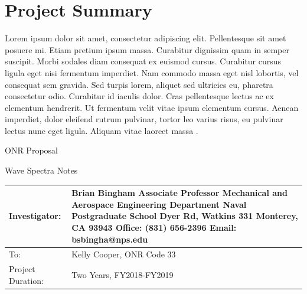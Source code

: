 \documentclass[11pt]{article}
\newcommand{\proposaltitle}{Wave Spectra Notes}
\begin{document}
\section*{Project Summary}
Lorem ipsum dolor sit amet, consectetur adipiscing elit. Pellentesque sit amet posuere mi. Etiam pretium ipsum massa. Curabitur dignissim quam in semper suscipit. Morbi sodales diam consequat ex euismod cursus. Curabitur cursus ligula eget nisi fermentum imperdiet. Nam commodo massa eget nisl lobortis, vel consequat sem gravida. Sed turpis lorem, aliquet sed ultricies eu, pharetra consectetur odio. Curabitur id iaculis dolor. Cras pellentesque lectus ac ex elementum hendrerit. Ut fermentum velit vitae ipsum elementum cursus. Aenean imperdiet, dolor eleifend rutrum pulvinar, tortor leo varius risus, eu pulvinar lectus nunc eget ligula. Aliquam vitae laoreet massa \cite{cook14survey}.

\newpage
\setcounter{page}{1}
\begin{center}

\vspace*{0.25in}

{\Large ONR Proposal}

\vspace*{0.25in}

{\huge \proposaltitle}

\vspace*{0.5in}
\renewcommand{\arraystretch}{2.0}
\begin{tabular}{|p{1.5in}|p{2.5in}|} \hline
Investigator: & 
  Brian Bingham \newline
  Associate Professor \newline
  Mechanical and Aerospace Engineering Department \newline
  Naval Postgraduate School  \newline
  700 Dyer Rd, Watkins 331  \newline
  Monterey, CA 93943  \newline
  Office: (831) 656-2396  \newline
  Email: bsbingha@nps.edu  \newline
\\ \hline
To: & Kelly Cooper, ONR Code 33 
\\ \hline
Project Duration: & Two Years, FY2018-FY2019 
\\ \hline
 
\end{tabular}
\end{center}
\vspace*{\fill}
\pagebreak
\end{document}
